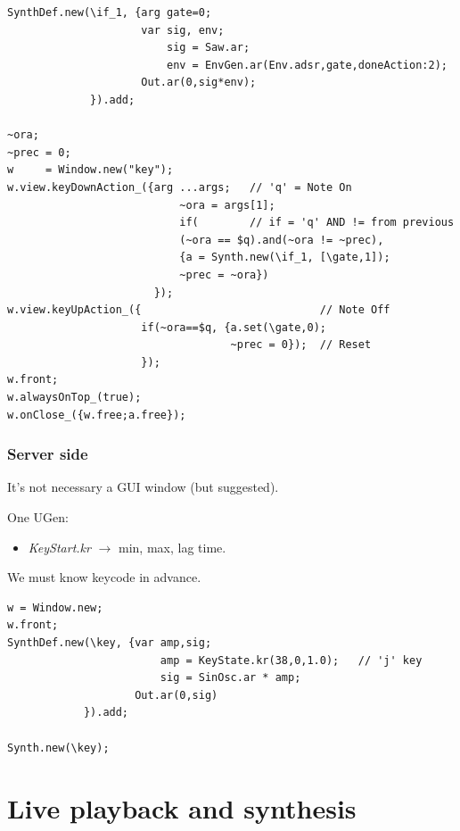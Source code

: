 \begin{lstlisting}[frame=single] 
SynthDef.new(\if_1, {arg gate=0;
                     var sig, env;
                         sig = Saw.ar;
                         env = EnvGen.ar(Env.adsr,gate,doneAction:2);
                     Out.ar(0,sig*env);
             }).add;

~ora;
~prec = 0;
w     = Window.new("key");
w.view.keyDownAction_({arg ...args;   // 'q' = Note On
                           ~ora = args[1];
                           if(        // if = 'q' AND != from previous
                           (~ora == $q).and(~ora != ~prec),
                           {a = Synth.new(\if_1, [\gate,1]);
                           ~prec = ~ora})
                       });
w.view.keyUpAction_({                            // Note Off
                     if(~ora==$q, {a.set(\gate,0);
                                   ~prec = 0});  // Reset
                     });
w.front;
w.alwaysOnTop_(true);
w.onClose_({w.free;a.free});
\end{lstlisting} 

\subsubsection{Server side}\label{key-server-side}

It's not necessary a GUI window (but suggested).

One UGen:

\begin{itemize}
\tightlist
\item \textit{KeyStart.kr} \(\rightarrow\) min, max, lag time.
\end{itemize}

We must know keycode in advance.

\begin{lstlisting}[frame=single, caption=key control Server model] 
w = Window.new;
w.front;
SynthDef.new(\key, {var amp,sig;
                        amp = KeyState.kr(38,0,1.0);   // 'j' key
                        sig = SinOsc.ar * amp;
                    Out.ar(0,sig)
            }).add;

Synth.new(\key); 
\end{lstlisting} 

\section{Live playback and synthesis}\label{Live-playback-and-synthesis}

